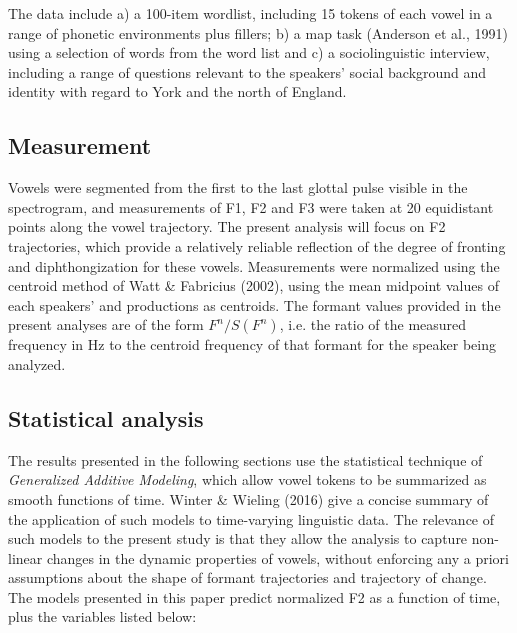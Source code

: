 \documentclass[12pt]{article}
\begin{document}
The data include a) a 100-item wordlist, including 15 tokens of each vowel in a range of phonetic environments plus fillers; b) a map task (Anderson et al., 1991) using a selection of words from the word list and c) a sociolinguistic interview, including a range of questions relevant to the speakers' social background and identity with regard to York and the north of England. 

\subsection{Measurement}

Vowels were segmented from the first to the last glottal pulse visible in the spectrogram, and measurements of F1, F2 and F3 were taken at 20 equidistant points along the vowel trajectory. The present analysis will focus on F2 trajectories, which provide a relatively reliable reflection of the degree of fronting and diphthongization for these vowels. Measurements were normalized using the centroid method of Watt \& Fabricius (2002), using the mean midpoint values of each speakers'  and  productions as centroids. The formant values provided in the present analyses are of the form $F^n/S (F^n)$, i.e. the ratio of the measured frequency in Hz to the centroid frequency of that formant for the speaker being analyzed.

\subsection{Statistical analysis}

The results presented in the following sections use the statistical technique of \textit{Generalized Additive Modeling}, which allow vowel tokens to be summarized as smooth functions of time. Winter \& Wieling (2016) give a concise summary of the application of such models to time-varying linguistic data. The relevance of such models to the present study is that they allow the analysis to capture non-linear changes in the dynamic properties of vowels, without enforcing any a priori assumptions about the shape of formant trajectories and trajectory of change. The models presented in this paper predict normalized F2 as a function of time, plus the variables listed below:
\end{document}

